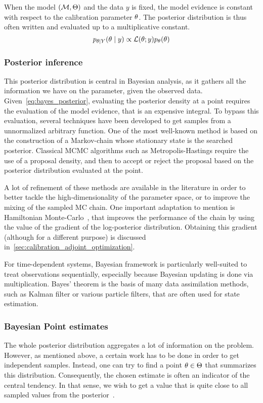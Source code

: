 \documentclass[../../Main_ManuscritThese.tex]{subfiles}
\begin{document}
When the model $(\mathcal{M},\Theta)$ and the data $y$ is fixed, the
model evidence is constant with respect to the calibration parameter
$\theta$. The posterior distribution is thus often written and evaluated
up to a multiplicative constant.
\begin{equation}
p_{\theta \mid Y}(\theta \mid y) \propto \mathcal{L}(\theta;y)p_{\theta}(\theta)
\end{equation}



\subsubsection{Posterior inference}
\label{sec:posterior_inference}
This posterior distribution is central in Bayesian analysis, as it
gathers all the information we have on the parameter, given the
observed data. Given~\cref{eq:bayes_posterior}, evaluating the
posterior density at a point requires the evaluation of the model
evidence, that is an expensive integral. To bypass this evaluation,
several techniques have been developed to get samples from a
unnormalized arbitrary function. One of the most well-known method is
based on the construction of a Markov-chain whose stationary state is
the searched posterior. Classical MCMC algorithms such as
Metropolis-Hastings require the use of a proposal density, and then
to accept or reject the proposal based on the posterior distribution
evaluated at the point.

A lot of refinement of these methods are available in the literature
in order to better tackle the high-dimensionality of the parameter
space, or to improve the mixing of the sampled MC chain. One important
adaptation to mention is Hamiltonian
Monte-Carlo~\citep{hanson_markov_2001,betancourt_conceptual_2017}, that
improves the performance of the chain by using the value of the
gradient of the log-posterior distribution. Obtaining this gradient
(although for a different purpose) is discussed
in~\cref{sec:calibration_adjoint_optimization}.


For time-dependent systems, Bayesian framework is particularly
well-suited to treat observations sequentially, especially because
Bayesian updating is done via multiplication. Bayes' theorem is the
basis of many data assimilation methods, such as Kalman filter or
various particle filters, that are often used for state estimation.

\subsubsection{Bayesian Point estimates}
\label{sec:bayes_point_estimates}
The whole posterior distribution aggregates a lot of information on
the problem. However, as mentioned above, a certain work has to be
done in order to get independent samples. Instead, one can try to find
a point $\theta \in \Theta$ that summarizes %
this distribution. Consequently, the chosen estimate is often an
indicator of the central tendency. In that sense, we wish to get a
value that is quite close to all sampled values from the
posterior~\citep{lehmann_theory_2006}.
\end{document}
